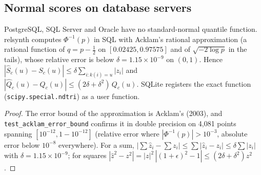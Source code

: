 \subsection{Normal scores on database servers}
\begin{proposition}\label{prop:acklam}
PostgreSQL, SQL Server and Oracle have no standard-normal quantile function. relsynth computes $\Phi^{-1}(p)$ in SQL with Acklam's rational approximation (a rational function of $q=p-\tfrac12$ on $[0.02425, 0.97575]$ and of $\sqrt{-2\log p}$ in the tails), whose relative error is below $\delta=1.15\times10^{-9}$ on $(0,1)$. Hence $|\hat S_c(u)-S_c(u)|\le \delta\sum_{i:k(i)=u}|z_i|$ and $|\hat Q_c(u)-Q_c(u)|\le (2\delta+\delta^2)\,Q_c(u)$. SQLite registers the exact function (\texttt{scipy.special.ndtri}) as a user function.
\end{proposition}
\begin{proof}
The error bound of the approximation is Acklam's (2003), and \texttt{test\_acklam\_error\_bound} confirms it in double precision on 4{,}081 points spanning $[10^{-12},1-10^{-12}]$ (relative error where $|\Phi^{-1}(p)|>10^{-3}$, absolute error below $10^{-8}$ everywhere). For a sum, $|\sum\hat z_i-\sum z_i|\le\sum|\hat z_i-z_i|\le\delta\sum|z_i|$ with $\delta=1.15\times10^{-9}$; for squares $|\hat z^2-z^2|=|z|^2\,|(1+\epsilon)^2-1|\le(2\delta+\delta^2)z^2$.
\end{proof}

